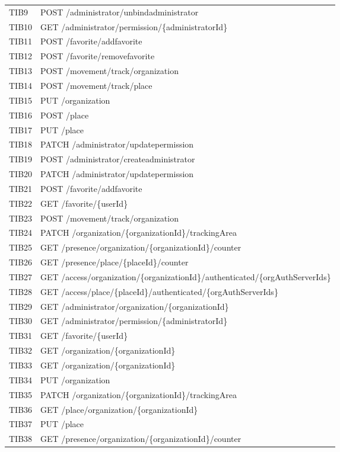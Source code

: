 {\begin{longtable}{C{2cm} C{12cm}}
	TIB9 & POST /administrator/unbindadministrator \\
	TIB10 & GET /administrator/permission/\{administratorId\} \\
	TIB11 & POST /favorite/addfavorite \\
	TIB12 & POST /favorite/removefavorite \\
	TIB13 & POST /movement/track/organization \\
	TIB14 & POST /movement/track/place \\
	TIB15 & PUT /organization \\
	TIB16 & POST /place \\
	TIB17 & PUT /place \\
	TIB18 & PATCH /administrator/updatepermission \\
	TIB19 & POST /administrator/createadministrator \\
	TIB20 & PATCH /administrator/updatepermission \\
	TIB21 & POST /favorite/addfavorite \\
	TIB22 & GET /favorite/\{userId\} \\
	TIB23 & POST /movement/track/organization \\
	TIB24 & PATCH /organization/\{organizationId\}/trackingArea \\
	TIB25 & GET /presence/organization/\{organizationId\}/counter \\
	TIB26 & GET /presence/place/\{placeId\}/counter \\
	TIB27 & GET /access/organization/\{organizationId\}/authenticated/\{orgAuthServerIds\} \\
	TIB28 & GET /access/place/\{placeId\}/authenticated/\{orgAuthServerIds\} \\
	TIB29 & GET /administrator/organization/\{organizationId\} \\
	TIB30 & GET /administrator/permission/\{administratorId\} \\
	TIB31 & GET /favorite/\{userId\} \\
	TIB32 & GET /organization/\{organizationId\} \\
	TIB33 & GET /organization/\{organizationId\} \\
	TIB34 & PUT /organization \\
	TIB35 & PATCH /organization/\{organizationId\}/trackingArea \\
	TIB36 & GET /place/organization/\{organizationId\} \\
	TIB37 & PUT /place \\
	TIB38 & GET /presence/organization/\{organizationId\}/counter \\

\end{longtable}}
